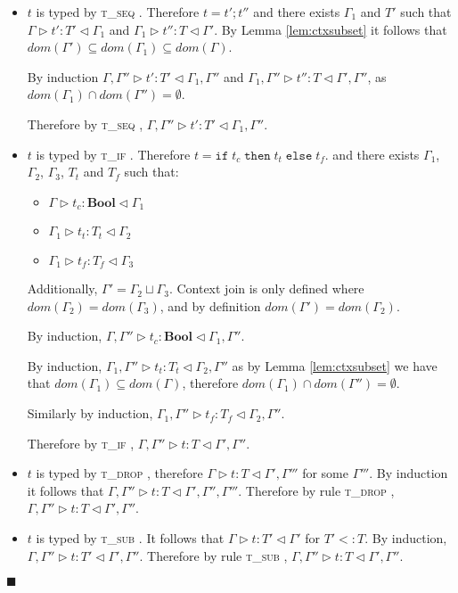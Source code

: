 \documentclass[preprint]{sigplanconf}
\newcommand{\lemref}[1]{Lemma \ref{#1}}
\newcommand{\tif}{\textsc{t\_if} }
\newcommand{\tseq}{\textsc{t\_seq} }
\newcommand{\tdrop}{\textsc{t\_drop} }
\newcommand{\tsub}{\textsc{t\_sub} }
\newcommand{\typerule}[4]{#1 \triangleright #2 : #3 \triangleleft #4}
\newcommand{\boolt}{\mathbf{Bool}}
\newcommand{\ift}[3]{\mathtt{if} \; #1 \; \mathtt{then} \; #2 \; \mathtt{else} \; #3}
\newcommand{\qed}{$\blacksquare$}
\newenvironment{proof}{\vspace{1ex}\noindent{\bf Proof}\hspace{0.5em}}
  {\hfill\qed\vspace{1ex}}
\begin{document}
\begin{proof}
\begin{itemize}
\item $t$ is typed by \tseq. Therefore $t = t' ; t''$ and there exists
$\Gamma_1$ and $T'$ such that $\typerule{\Gamma}{t'}{T'}{\Gamma_1}$
and $\typerule{\Gamma_1}{t''}{T}{\Gamma'}$. By \lemref{lem:ctxsubset}
it follows that $dom(\Gamma') \subseteq dom(\Gamma_1) \subseteq dom(\Gamma)$.

By induction
$\typerule{\Gamma, \Gamma''}{t'}{T'}{\Gamma_1, \Gamma''}$
and 
$\typerule{\Gamma_1, \Gamma''}{t''}{T}{\Gamma', \Gamma''}$,
as $dom(\Gamma_1) \cap dom(\Gamma'') = \emptyset$.

Therefore by \tseq, 
$\typerule{\Gamma, \Gamma''}{t'}{T'}{\Gamma_1, \Gamma''}$.

\item $t$ is typed by \tif. Therefore $t = \ift{t_c}{t_t}{t_f}$. and there
exists $\Gamma_1$, $\Gamma_2$, $\Gamma_3$, $T_t$ and $T_f$ such that:

\begin{itemize}
\item $\typerule{\Gamma}{t_c}{\boolt}{\Gamma_1}$
\item $\typerule{\Gamma_1}{t_t}{T_t}{\Gamma_2}$
\item $\typerule{\Gamma_1}{t_f}{T_f}{\Gamma_3}$
\end{itemize}

Additionally, $\Gamma' = \Gamma_2 \sqcup \Gamma_3$.
Context join is only defined where $dom(\Gamma_2) = dom(\Gamma_3)$,
and by definition $dom(\Gamma') = dom(\Gamma_2)$.

By induction, $\typerule{\Gamma, \Gamma''}{t_c}{\boolt}{\Gamma_1, \Gamma''}$.

By induction, $\typerule{\Gamma_1, \Gamma''}{t_t}{T_t}{\Gamma_2, \Gamma''}$
as by \lemref{lem:ctxsubset} we have that $dom(\Gamma_1) \subseteq dom(\Gamma)$,
therefore $dom(\Gamma_1) \cap dom(\Gamma'') = \emptyset$.

Similarly by induction, 
$\typerule{\Gamma_1, \Gamma''}{t_f}{T_f}{\Gamma_2, \Gamma''}$.

Therefore by \tif, $\typerule{\Gamma, \Gamma''}{t}{T}{\Gamma', \Gamma''}$.

\item $t$ is typed by \tdrop, therefore $\typerule{\Gamma}{t}{T}{\Gamma', \Gamma'''}$
for some $\Gamma'''$. By induction it follows that
$\typerule{\Gamma, \Gamma''}{t}{T}{\Gamma', \Gamma'', \Gamma'''}$.
Therefore by rule \tdrop,
$\typerule{\Gamma, \Gamma''}{t}{T}{\Gamma', \Gamma''}$.

\item $t$ is typed by \tsub. It follows that $\typerule{\Gamma}{t}{T'}{\Gamma'}$
for $T' <: T$. By induction, $\typerule{\Gamma, \Gamma''}{t}{T'}{\Gamma', \Gamma''}$.
Therefore by rule \tsub, $\typerule{\Gamma, \Gamma''}{t}{T}{\Gamma', \Gamma''}$.


\end{itemize}
\end{proof}
\end{document}
